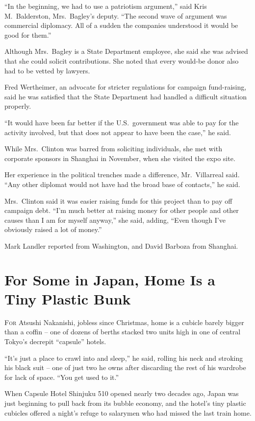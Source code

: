 ﻿\documentclass[12pt]{article}
\begin{document}
``In the beginning, we had to use a patriotism argument,'' said Kris M.~Balderston, Mrs.~Bagley's
deputy. ``The second wave of argument was commercial diplomacy. All of a sudden the companies
understood it would be good for them.''

Although Mrs.~Bagley is a State Department employee, she said she was advised that she could solicit
contributions. She noted that every would-be donor also had to be vetted by lawyers.

Fred Wertheimer, an advocate for stricter regulations for campaign fund-raising, said he was
satisfied that the State Department had handled a difficult situation properly.

``It would have been far better if the U.S.~government was able to pay for the activity involved,
but that does not appear to have been the case,'' he said.

While Mrs.~Clinton was barred from soliciting individuals, she met with corporate sponsors in
Shanghai in November, when she visited the expo site.

Her experience in the political trenches made a difference, Mr.~Villarreal said. ``Any other
diplomat would not have had the broad base of contacts,'' he said.

Mrs.~Clinton said it was easier raising funds for this project than to pay off campaign debt. ``I'm
much better at raising money for other people and other causes than I am for myself anyway,'' she
said, adding, ``Even though I've obviously raised a lot of money.''

Mark Landler reported from Washington, and David Barboza from Shanghai.

\section{For Some in Japan, Home Is a Tiny Plastic Bunk}

\lettrine{F}{or} Atsushi Nakanishi, jobless since Christmas, home is a
cubicle barely bigger than a coffin -- one of dozens of berths stacked two units high in one of
central Tokyo's decrepit ``capsule'' hotels.

``It's just a place to crawl into and sleep,'' he said, rolling his neck and stroking his black suit
-- one of just two he owns after discarding the rest of his wardrobe for lack of space. ``You get
used to it.''

When Capsule Hotel Shinjuku 510 opened nearly two decades ago, Japan was just beginning to pull back
from its bubble economy, and the hotel's tiny plastic cubicles offered a night's refuge to salarymen
who had missed the last train home.
\end{document}
